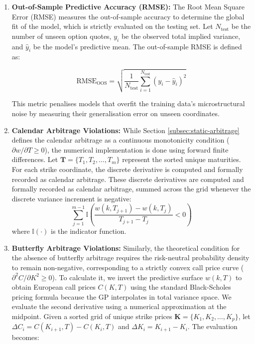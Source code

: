 \documentclass[12pt,oneside]{report}
\theoremstyle{definition}
\theoremstyle{remark}
\begin{document}
\begin{enumerate}
	\item \textbf{Out-of-Sample Predictive Accuracy (RMSE):}
	The Root Mean Square Error (RMSE) measures the out-of-sample accuracy to determine the global fit of the model, which is strictly evaluated on the testing set. Let $N_{\text{test}}$ be the number of unseen option quotes, $y_i$ be the observed total implied variance, and $\hat{y}_i$ be the model's predictive mean. The out-of-sample RMSE is defined as:

\begin{equation}
    \text{RMSE}_{\text{OOS}} = \sqrt{\frac{1}{N_{\text{test}}} \sum_{i=1}^{N_{\text{test}}} (y_i - \hat{y}_i)^2}
\end{equation}

This metric penalises models that overfit the training data's microstructural noise by measuring their generalisation error on unseen coordinates.

	\item \textbf{Calendar Arbitrage Violations:}
	While Section \ref{subsec:static-arbitrage} defines the calendar arbitrage as a continuous monotonicity condition ($\partial w / \partial T \geq 0$), the numerical implementation is done using forward finite differences. Let $\mathbf{T} = \{T_1, T_2, \dots, T_m\}$ represent the sorted unique maturities. For each strike coordinate, the discrete derivative is computed and formally recorded as calendar arbitrage. These discrete derivatives are computed and formally recorded as calendar arbitrage, summed across the grid whenever the discrete variance increment is negative:
\begin{equation}
    \sum_{j=1}^{m-1} \mathbb{I} \left( \frac{w(k, T_{j+1}) - w(k, T_j)}{T_{j+1} - T_j} < 0 \right)
\end{equation}
where $\mathbb{I}(\cdot)$ is the indicator function.

	\item \textbf{Butterfly Arbitrage Violations:}
	Similarly, the theoretical condition for the absence of butterfly arbitrage requires the risk-neutral probability density to remain non-negative, corresponding to a strictly convex call price curve ($\partial^2 C / \partial K^2 \geq 0$). To calculate it, we invert the predictive surface $w(k, T)$ to obtain European call prices $C(K, T)$ using the standard Black-Scholes pricing formula because the GP interpolates in total variance space. We evaluate the second derivative using a numerical approximation at the midpoint. Given a sorted grid of unique strike prices $\mathbf{K} = \{K_1, K_2, \dots, K_p\}$, let $\Delta C_i = C(K_{i+1}, T) - C(K_i, T)$ and $\Delta K_i = K_{i+1} - K_i$. The evaluation becomes:


\end{enumerate}
\end{document}

